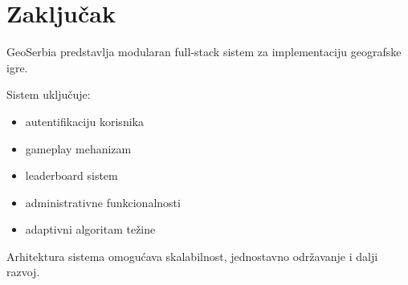 \documentclass[a4paper,12pt,projekat]{etf}
\begin{document}

\chapter{Zaključak}

GeoSerbia predstavlja modularan full-stack sistem
za implementaciju geografske igre.

Sistem uključuje:

\begin{itemize}

\item autentifikaciju korisnika
\item gameplay mehanizam
\item leaderboard sistem
\item administrativne funkcionalnosti
\item adaptivni algoritam težine

\end{itemize}

Arhitektura sistema omogućava skalabilnost,
jednostavno održavanje i dalji razvoj.
\end{document}
